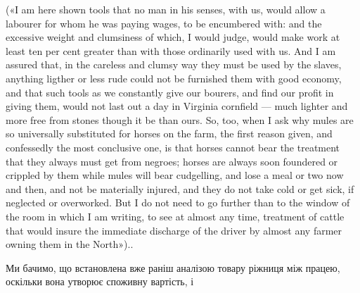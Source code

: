 {(«І am here shown tools that no man in his senses, with us, would
allow a labourer for whom he was paying wages, to be encumbered with:
and the excessive weight and clumsiness of which, I would judge, would
make work at least ten per cent greater than with those ordinarily used
with us. And I am assured that, in the careless and clumsy way they must
be used by the slaves, anything ligther or less rude could not be furnished
them with good economy, and that such tools as we constantly give our
bourers, and find our profit in giving them, would not last out a day in
Virginia cornfield — much lighter and more free from stones though it be
than ours. So, too, when I ask why mules are so universally substituted for
horses on the farm, the first reason given, and confessedly the most conclusive
one, is that horses cannot bear the treatment that they always must get
from negroes; horses are always soon foundered or crippled by them while
mules will bear cudgelling, and lose a meal or two now and then, and not
be materially injured, and they do not take cold or get sick, if neglected
or overworked. But I do not need to go further than to the window of the room
in which I am writing, to see at almost any time, treatment of cattle
that would insure the immediate discharge of the driver by almost any farmer
owning them in the North»).}.

Ми бачимо, що встановлена вже раніш аналізою товару ріжниця
між працею, оскільки вона утворює споживну вартість, і
\parbreak{}  %
